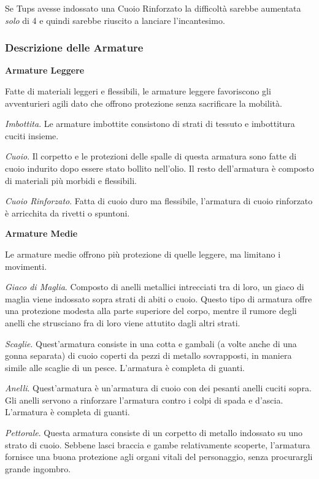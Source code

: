 \begin{multicols}{2}
Se Tups avesse indossato una Cuoio Rinforzato la difficoltà sarebbe aumentata \emph{solo} di 4 e quindi sarebbe riuscito a lanciare l'incantesimo.

\subsubsection{Descrizione delle Armature}

\textbf{Armature Leggere}

Fatte di materiali leggeri e flessibili, le armature leggere favoriscono gli avventurieri agili dato che offrono protezione senza sacrificare la mobilità.

\emph{Imbottita}. Le armature imbottite consistono di strati di tessuto e imbottitura cuciti insieme.

\emph{Cuoio}. Il corpetto e le protezioni delle spalle di questa armatura sono fatte di cuoio indurito dopo essere stato bollito nell'olio. Il resto dell'armatura è composto di
materiali più morbidi e flessibili.

\emph{Cuoio Rinforzato}. Fatta di cuoio duro ma flessibile, l'armatura di cuoio rinforzato è arricchita da rivetti o spuntoni.

\textbf{Armature Medie}

Le armature medie offrono più protezione di quelle leggere, ma limitano i movimenti.

\emph{Giaco di Maglia}. Composto di anelli metallici intrecciati tra di loro, un giaco di maglia viene indossato sopra strati di abiti o cuoio. Questo tipo di armatura offre una protezione modesta alla parte superiore del corpo, mentre il rumore degli anelli che strusciano fra di loro viene attutito dagli altri strati.

\emph{Scaglie}. Quest'armatura consiste in una cotta e gambali (a volte anche di una gonna separata) di cuoio coperti da pezzi di metallo sovrapposti, in maniera simile alle scaglie di un pesce. L'armatura è completa di guanti.

\emph{Anelli}. Quest'armatura è un'armatura di cuoio con dei pesanti anelli cuciti sopra. Gli anelli servono a rinforzare l'armatura contro i colpi di spada e d'ascia. L'armatura è completa di guanti.

\emph{Pettorale}. Questa armatura consiste di un corpetto di metallo indossato su uno strato di cuoio. Sebbene lasci braccia e gambe relativamente scoperte, l'armatura fornisce una buona protezione agli organi vitali del personaggio, senza procurargli grande ingombro.


\end{multicols}
